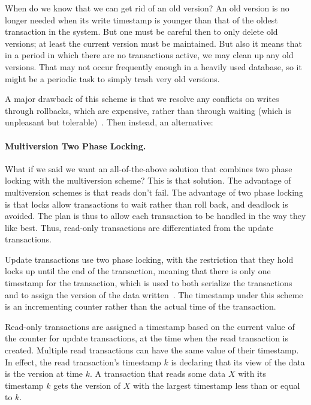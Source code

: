 \documentclass[a4paper]{report}
\begin{document}
When do we know that we can get rid of an old version? An old version is no longer needed when its write timestamp is younger than that of the oldest transaction in the system. But one must be careful then to only delete old versions; at least the current version must be maintained. But also it means that in a period in which there are no transactions active, we may clean up any old versions. That may not occur frequently enough in a heavily used database, so it might be a periodic task to simply trash very old versions.

A major drawback of this scheme is that we resolve any conflicts on writes through rollbacks, which are expensive, rather than through waiting (which is unpleasant but tolerable)~\cite{dsc}. Then instead, an alternative:

\paragraph{Multiversion Two Phase Locking.} What if we said we want an all-of-the-above solution that combines two phase locking with the multiversion scheme? This is that solution. The advantage of multiversion schemes is that reads don't fail. The advantage of two phase locking is that locks allow transactions to wait rather than roll back, and deadlock is avoided. The plan is thus to allow each transaction to be handled in the way they like best. Thus, read-only transactions are differentiated from the update transactions.

Update transactions use two phase locking, with the restriction that they hold locks up until the end of the transaction, meaning that there is only one timestamp for the transaction, which is used to both serialize the transactions and to assign the version of the data written~\cite{dsc}. The timestamp under this scheme is an incrementing counter rather than the actual time of the transaction. 

Read-only transactions are assigned a timestamp based on the current value of the counter for update transactions, at the time when the read transaction is created. Multiple read transactions can have the same value of their timestamp. In effect, the read transaction's timestamp $k$ is declaring that its view of the data is the version at time $k$. A transaction that reads some data $X$ with its timestamp $k$ gets the version of $X$ with the largest timestamp less than or equal to $k$. 
\end{document}
